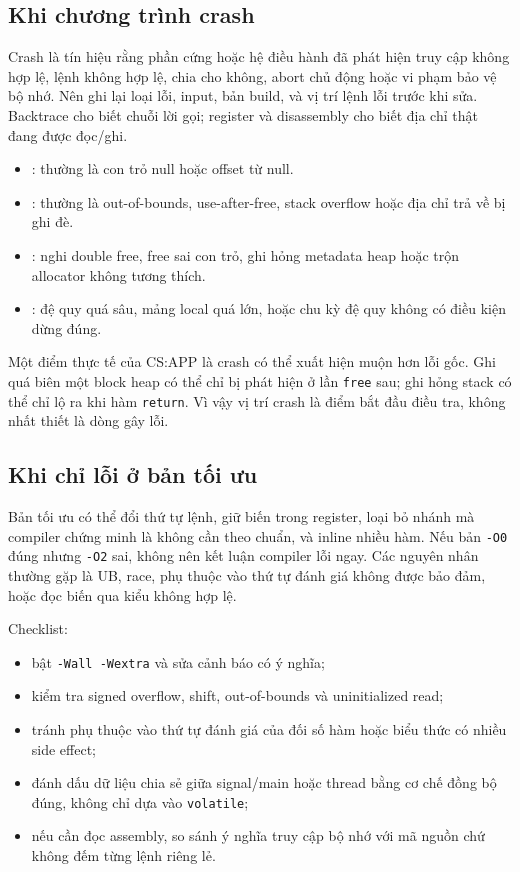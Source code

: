 \documentclass[11pt]{article}
\begin{document}
\subsection{Khi chương trình crash}

Crash là tín hiệu rằng phần cứng hoặc hệ điều hành đã phát hiện truy cập không
hợp lệ, lệnh không hợp lệ, chia cho không, abort chủ động hoặc vi phạm bảo vệ
bộ nhớ. Nên ghi lại loại lỗi, input, bản build, và vị trí lệnh lỗi trước khi sửa.
Backtrace cho biết chuỗi lời gọi; register và disassembly cho biết địa chỉ thật
đang được đọc/ghi.

\begin{itemize}
  \item {}: thường là con trỏ null hoặc
        offset từ null.
  \item {}: thường là out-of-bounds,
        use-after-free, stack overflow hoặc địa chỉ trả về bị ghi đè.
  \item {}: nghi double free, free sai con trỏ, ghi
        hỏng metadata heap hoặc trộn allocator không tương thích.
  \item {}: đệ quy quá sâu, mảng local quá lớn, hoặc chu kỳ
        đệ quy không có điều kiện dừng đúng.
\end{itemize}

Một điểm thực tế của CS:APP là crash có thể xuất hiện muộn hơn lỗi gốc. Ghi quá
biên một block heap có thể chỉ bị phát hiện ở lần \texttt{free} sau; ghi hỏng
stack có thể chỉ lộ ra khi hàm \texttt{return}. Vì vậy vị trí crash là điểm bắt
đầu điều tra, không nhất thiết là dòng gây lỗi.

\subsection{Khi chỉ lỗi ở bản tối ưu}

Bản tối ưu có thể đổi thứ tự lệnh, giữ biến trong register, loại bỏ nhánh mà
compiler chứng minh là không cần theo chuẩn, và inline nhiều hàm. Nếu bản
\texttt{-O0} đúng nhưng \texttt{-O2} sai, không nên kết luận compiler lỗi ngay.
Các nguyên nhân thường gặp là UB, race, phụ thuộc vào thứ tự đánh giá không được
bảo đảm, hoặc đọc biến qua kiểu không hợp lệ.

Checklist:
\begin{itemize}
  \item bật \texttt{-Wall -Wextra} và sửa cảnh báo có ý nghĩa;
  \item kiểm tra signed overflow, shift, out-of-bounds và uninitialized read;
  \item tránh phụ thuộc vào thứ tự đánh giá của đối số hàm hoặc biểu thức có
        nhiều side effect;
  \item đánh dấu dữ liệu chia sẻ giữa signal/main hoặc thread bằng cơ chế đồng
        bộ đúng, không chỉ dựa vào \texttt{volatile};
  \item nếu cần đọc assembly, so sánh ý nghĩa truy cập bộ nhớ với mã nguồn chứ
        không đếm từng lệnh riêng lẻ.
\end{itemize}
\end{document}
